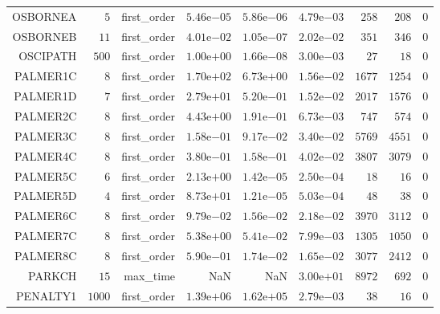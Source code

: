 \begin{longtable}{rrrrrrrrr}
OSBORNEA & \(     5\) & first\_order & \( 5.46\)e\(-05\) & \( 5.86\)e\(-06\) & \( 4.79\)e\(-03\) & \(   258\) & \(   208\) & \(     0\) \\
OSBORNEB & \(    11\) & first\_order & \( 4.01\)e\(-02\) & \( 1.05\)e\(-07\) & \( 2.02\)e\(-02\) & \(   351\) & \(   346\) & \(     0\) \\
OSCIPATH & \(   500\) & first\_order & \( 1.00\)e\(+00\) & \( 1.66\)e\(-08\) & \( 3.00\)e\(-03\) & \(    27\) & \(    18\) & \(     0\) \\
PALMER1C & \(     8\) & first\_order & \( 1.70\)e\(+02\) & \( 6.73\)e\(+00\) & \( 1.56\)e\(-02\) & \(  1677\) & \(  1254\) & \(     0\) \\
PALMER1D & \(     7\) & first\_order & \( 2.79\)e\(+01\) & \( 5.20\)e\(-01\) & \( 1.52\)e\(-02\) & \(  2017\) & \(  1576\) & \(     0\) \\
PALMER2C & \(     8\) & first\_order & \( 4.43\)e\(+00\) & \( 1.91\)e\(-01\) & \( 6.73\)e\(-03\) & \(   747\) & \(   574\) & \(     0\) \\
PALMER3C & \(     8\) & first\_order & \( 1.58\)e\(-01\) & \( 9.17\)e\(-02\) & \( 3.40\)e\(-02\) & \(  5769\) & \(  4551\) & \(     0\) \\
PALMER4C & \(     8\) & first\_order & \( 3.80\)e\(-01\) & \( 1.58\)e\(-01\) & \( 4.02\)e\(-02\) & \(  3807\) & \(  3079\) & \(     0\) \\
PALMER5C & \(     6\) & first\_order & \( 2.13\)e\(+00\) & \( 1.42\)e\(-05\) & \( 2.50\)e\(-04\) & \(    18\) & \(    16\) & \(     0\) \\
PALMER5D & \(     4\) & first\_order & \( 8.73\)e\(+01\) & \( 1.21\)e\(-05\) & \( 5.03\)e\(-04\) & \(    48\) & \(    38\) & \(     0\) \\
PALMER6C & \(     8\) & first\_order & \( 9.79\)e\(-02\) & \( 1.56\)e\(-02\) & \( 2.18\)e\(-02\) & \(  3970\) & \(  3112\) & \(     0\) \\
PALMER7C & \(     8\) & first\_order & \( 5.38\)e\(+00\) & \( 5.41\)e\(-02\) & \( 7.99\)e\(-03\) & \(  1305\) & \(  1050\) & \(     0\) \\
PALMER8C & \(     8\) & first\_order & \( 5.90\)e\(-01\) & \( 1.74\)e\(-02\) & \( 1.65\)e\(-02\) & \(  3077\) & \(  2412\) & \(     0\) \\
PARKCH & \(    15\) & max\_time &       NaN &       NaN & \( 3.00\)e\(+01\) & \(  8972\) & \(   692\) & \(     0\) \\
PENALTY1 & \(  1000\) & first\_order & \( 1.39\)e\(+06\) & \( 1.62\)e\(+05\) & \( 2.79\)e\(-03\) & \(    38\) & \(    16\) & \(     0\) \\

\end{longtable}
